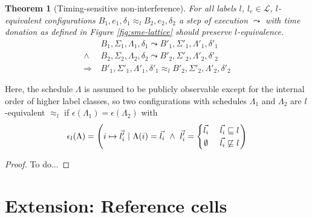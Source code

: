 \documentclass[10pt,preprint]{sigplanconf}
\newcommand{\arrayStretch}{1.28}
\newtheorem{theorem}{Theorem}
\begin{document}
\begin{theorem}[Timing-sensitive non-interference]
  For all labels $l$, $l_e \in \mathcal{L}$, $l$-equivalent configurations $B_1,e_1,\delta_1 \approx_l B_2,e_2,\delta_2$ a step of execution $\leadsto$ with time donation as defined in Figure \ref{fig:sme-lattice} should preserve $l$-equivalence.
  \begin{align*}
    &B_1,\Sigma_1, \Lambda_1, \delta_1 \leadsto B'_1,\Sigma'_1, \Lambda'_1, \delta'_1 \\
    \wedge~~&B_2,\Sigma_2,\Lambda_2, \delta_2 \leadsto B'_2,\Sigma'_2, \Lambda'_2, \delta'_2 \\
    \Rightarrow~&B'_1,\Sigma'_1, \Lambda'_1, \delta'_1 \approx_l B'_2,\Sigma'_2, \Lambda'_2, \delta'_2
  \end{align*}
\end{theorem}

Here, the schedule $\Lambda$ is assumed to be publicly observable except for the internal order of higher label classes, so two configurations with schedules $\Lambda_1$ and $\Lambda_2$ are $l$-equivalent $\approx_l$ if $\epsilon(\Lambda_1) = \epsilon(\Lambda_2)$ with
\[\arraycolsep=1.6pt\def\arraystretch{\arrayStretch}
\begin{array}{lr}
\epsilon_{l}(\Lambda) = \left(i \mapsto \vec{l'_i} ~|~\Lambda(i) = \vec{l_i} ~\wedge~ \vec{l'_i} = \left \{ \begin{matrix} \vec{l_i} &~~~\vec{l_i} \sqsubseteq l \\ \emptyset &~~~\vec{l_i} \not \sqsubseteq l \end{matrix} \right. \right) \\
\end{array} \]

\begin{proof}
  To do...
\end{proof}

\section{Extension: Reference cells}
\label{s:ref}
\end{document}
